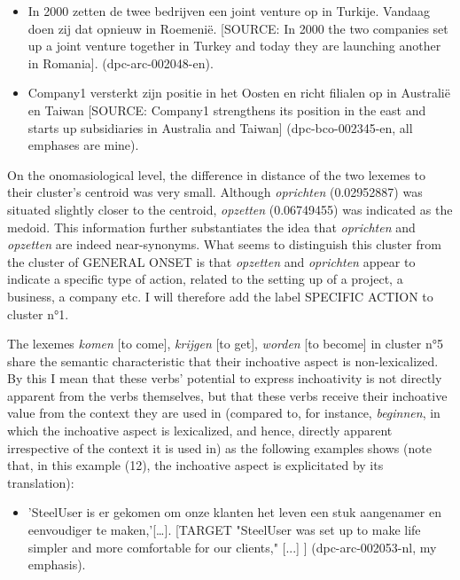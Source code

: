 \begin{itemize}
\item \begin{styleVoorbeeld}
In 2000 zetten de twee bedrijven een joint venture op in Turkije. Vandaag doen zij dat opnieuw in Roemenië. [SOURCE: In 2000 the two companies set up a joint venture together in Turkey and today they are launching another in Romania]. (dpc-arc-002048-en).
\end{styleVoorbeeld}
\item \begin{styleVoorbeeld}
Company1 versterkt zijn positie in het Oosten en richt filialen op in Australië en Taiwan [SOURCE: Company1 strengthens its position in the east and starts up subsidiaries in Australia and Taiwan] (dpc-bco-002345-en, all emphases are mine).
\end{styleVoorbeeld}
\end{itemize}

On the onomasiological level, the difference in distance of the two lexemes to their cluster’s centroid was very small. Although \textit{oprichten} (0.02952887) was situated slightly closer to the centroid, \textit{opzetten} (0.06749455) was indicated as the medoid. This information further substantiates the idea that \textit{oprichten} and \textit{opzetten} are indeed near-synonyms. What seems to distinguish this cluster from the cluster of GENERAL ONSET is that \textit{opzetten} and \textit{oprichten} appear to indicate a specific type of action, related to the setting up of a project, a business, a company etc. I will therefore add the label SPECIFIC ACTION to cluster n°1.

The lexemes \textit{komen} [to come], \textit{krijgen} [to get], \textit{worden} [to become] in cluster n°5 share the semantic characteristic that their inchoative aspect is non-lexicalized. By this I mean that these verbs’ potential to express inchoativity is not directly apparent from the verbs themselves, but that these verbs receive their inchoative value from the context they are used in (compared to, for instance, \textit{beginnen}, in which the inchoative aspect is lexicalized, and hence, directly apparent irrespective of the context it is used in) as the following examples shows (note that, in this example (12), the inchoative aspect is explicitated by its translation):

\begin{itemize}
\item \begin{styleVoorbeeld}
'SteelUser is er gekomen om onze klanten het leven een stuk aangenamer en eenvoudiger te maken,'[…]. [TARGET "SteelUser was set up to make life simpler and more comfortable for our clients," [...] ] (dpc-arc-002053-nl, my emphasis).
\end{styleVoorbeeld}
\end{itemize}


